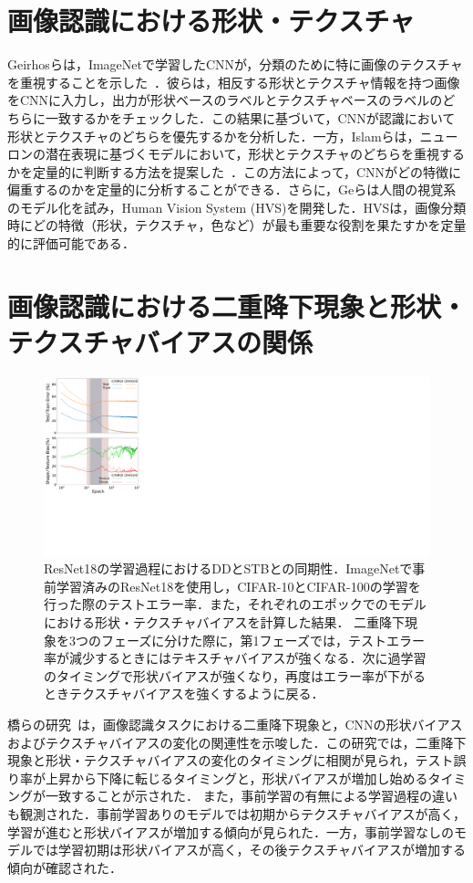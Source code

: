 \section{画像認識における形状・テクスチャ}
Geirhosらは，ImageNetで学習したCNNが，分類のために特に画像のテクスチャを重視することを示した~\cite{Geirhos}．彼らは，相反する形状とテクスチャ情報を持つ画像をCNNに入力し，出力が形状ベースのラベルとテクスチャベースのラベルのどちらに一致するかをチェックした．この結果に基づいて，CNNが認識において形状とテクスチャのどちらを優先するかを分析した．一方，Islamらは，ニューロンの潜在表現に基づくモデルにおいて，形状とテクスチャのどちらを重視するかを定量的に判断する方法を提案した~\cite{Islam}．この方法によって，CNNがどの特徴に偏重するのかを定量的に分析することができる．さらに，Geらは人間の視覚系のモデル化を試み，Human Vision System (HVS)を開発した．HVSは，画像分類時にどの特徴（形状，テクスチャ，色など）が最も重要な役割を果たすかを定量的に評価可能である\cite{Ge}．

\section{画像認識における二重降下現象と形状・テクスチャバイアスの関係}
\begin{figure}[t]
    \centering
    \includegraphics[width=\linewidth]{fig/iwaseICPR.pdf}
    \caption{ResNet18の学習過程におけるDDとSTBとの同期性．ImageNetで事前学習済みのResNet18を使用し，CIFAR-10とCIFAR-100の学習を行った際のテストエラー率．また，それぞれのエポックでのモデルにおける形状・テクスチャバイアスを計算した結果．
    二重降下現象を3つのフェーズに分けた際に，第1フェーズでは，テストエラー率が減少するときにはテキスチャバイアスが強くなる．次に過学習のタイミングで形状バイアスが強くなり，再度はエラー率が下がるときテクスチャバイアスを強くするように戻る．}
    \label{fig:iwaseICPR}
\end{figure}
橋らの研究~\cite{DD_STB}は，画像認識タスクにおける二重降下現象と，CNNの形状バイアスおよびテクスチャバイアスの変化の関連性を示唆した．この研究では，二重降下現象と形状・テクスチャバイアスの変化のタイミングに相関が見られ，テスト誤り率が上昇から下降に転じるタイミングと，形状バイアスが増加し始めるタイミングが一致することが示された．
また，事前学習の有無による学習過程の違いも観測された．事前学習ありのモデルでは初期からテクスチャバイアスが高く，学習が進むと形状バイアスが増加する傾向が見られた．一方，事前学習なしのモデルでは学習初期は形状バイアスが高く，その後テクスチャバイアスが増加する傾向が確認された．

